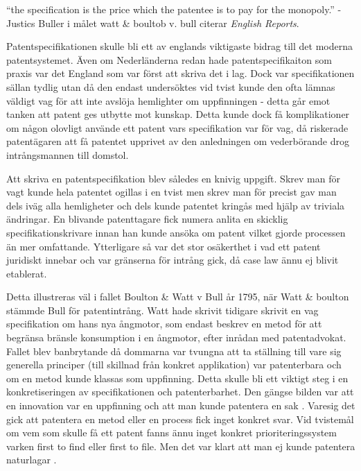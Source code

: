 

“the specification is the price which 
the patentee is to pay for the monopoly.” -Justics Buller i målet watt \& boultob v. bull \cite{oked} citerar \emph{English Reports}.


Patentspecifikationen skulle bli ett av englands viktigaste bidrag till det
moderna patentsystemet. Även om
Nederländerna redan hade patentspecifikaiton som praxis var det England som var först att skriva det i
lag. \cite{macleod} Dock var specifikationen sällan tydlig utan då den endast undersöktes vid tvist
kunde den ofta lämnas väldigt vag för att inte avslöja hemlighter om uppfinningen - detta går emot tanken
att patent ges utbytte mot kunskap. Detta kunde dock få komplikationer om någon olovligt använde ett
patent vars specifikation var för vag, då riskerade patentägaren att få patentet upprivet av den anledningen om vederbörande drog intrångsmannen till domstol.

Att skriva en patentspecifikation blev således en knivig uppgift. Skrev man för vagt kunde hela patentet
ogillas i en tvist men skrev man för precist gav man dels iväg alla hemligheter och dels kunde patentet
kringås med hjälp av triviala ändringar\cite{macleod}. En
blivande patenttagare fick numera anlita en skicklig specifikationskrivare innan han kunde ansöka om
patent vilket gjorde processen än mer omfattande\cite{macleod}. Ytterligare så var det stor osäkerthet i vad ett patent juridiskt innebar och var gränserna för intrång gick, då case law ännu ej blivit etablerat.

Detta illustreras väl i fallet Boulton \& Watt v Bull år 1795, när Watt \& boulton stämmde Bull för patentintrång. Watt hade skrivit tidigare skrivit en vag specifikation om hans nya ångmotor, som endast beskrev en metod för att begränsa bränsle konsumption i en ångmotor, efter inrådan med patentadvokat\cite{bracha}. Fallet blev banbrytande då dommarna var tvungna att ta ställning till vare sig generella principer (till skillnad från konkret applikation) var patenterbara och om en metod kunde klassas som uppfinning\cite{bracha}. Detta skulle bli ett viktigt steg i en konkretiseringen av specifikationen och patenterbarhet. Den gängse bilden var att en innovation var en uppfinning och att man kunde patentera en sak \cite{bracha}. Varesig det gick att patentera en metod eller en process fick inget konkret svar. Vid tvistemål om vem som skulle få ett patent fanns ännu inget konkret prioriteringssystem varken first to find eller first to file\cite{bracha}. Men det var klart att man ej kunde patentera naturlagar \cite{bracha}.

